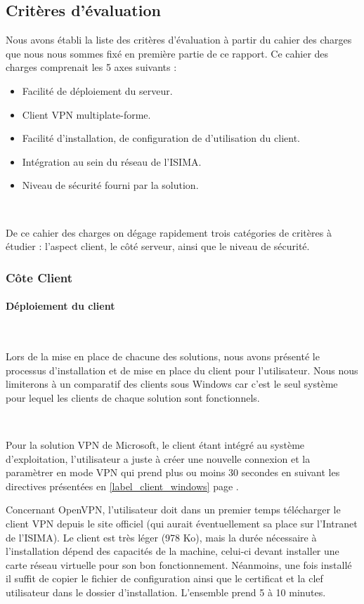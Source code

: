 \subsection{Critères d'évaluation}

Nous avons établi la liste des critères d'évaluation à partir du cahier des charges que nous nous sommes fixé en première partie de ce rapport. Ce cahier des charges comprenait les 5 axes suivants :
\begin{itemize}
 	\item Facilité de déploiement du serveur.
	\item Client VPN multiplate-forme.
	\item Facilité d'installation, de configuration de d'utilisation du client.
	\item Intégration au sein du réseau de l'ISIMA.
	\item Niveau de sécurité fourni par la solution.
\end{itemize}
~

De ce cahier des charges on dégage rapidement trois catégories de critères à étudier : l'aspect client, le côté serveur, ainsi que le niveau de sécurité.

\subsubsection{Côte Client}

\paragraph{Déploiement du client}
~

Lors de la mise en place de chacune des solutions, nous avons présenté le processus d'installation et de mise en place du client pour l'utilisateur. Nous nous limiterons à un comparatif des clients sous Windows car c'est le seul système pour lequel les clients de chaque solution sont fonctionnels.

~

Pour la solution VPN de Microsoft, le client étant intégré au système d'exploitation, l'utilisateur a juste à créer une nouvelle connexion et la paramètrer en mode VPN qui prend plus ou moins 30 secondes en suivant les directives présentées en \ref{label_client_windows} page \pageref{label_client_windows}.

Concernant OpenVPN, l'utilisateur doit dans un premier temps télécharger le client VPN depuis le site officiel (qui aurait éventuellement sa place sur l'Intranet de l'ISIMA). Le client est très léger (978 Ko), mais la durée nécessaire à l'installation dépend des capacités de la machine, celui-ci devant installer une carte réseau virtuelle pour son bon fonctionnement. Néanmoins, une fois installé il suffit de copier le fichier de configuration ainsi que le certificat et la clef utilisateur dans le dossier d'installation. L'ensemble prend 5 à 10 minutes.


